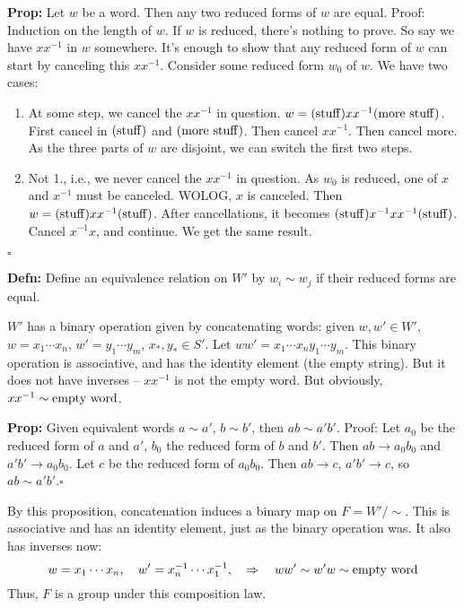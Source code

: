 \documentclass[10pt,letterpaper]{article}
\newcommand{\n}{\hfill\break}
\newcommand{\up}{\vspace{-\baselineskip}}
\newcommand{\hangblock}[2]{\par\noindent\settowidth{\hangindent}{\textbf{#1: }}\textbf{#1: }\!\!\!#2}
\newcommand{\defn}[1]{\hangblock{Defn}{#1}}
\newcommand{\prop}[1]{\hangblock{Prop}{#1}}
\newcommand{\proven}{\;$\square$\n}
\newcommand{\ptxt}[1]{\textrm{\textnormal{#1}}}
\newcommand{\inv}{^{-1}}
\begin{document}
\newpage
\prop{
	Let $w$ be a word. Then any two reduced forms of $w$ are equal.\n
	Proof: Induction on the length of $w$. If $w$ is reduced, there's nothing to prove. So say we have $xx\inv$ in $w$ somewhere. It's enough to show that any reduced form of $w$ can start by canceling this $xx\inv$.\n
	Consider some reduced form $w_{0}$ of $w$. We have two cases:
	\begin{enumerate}[leftmargin=4\parindent]
		\item At some step, we cancel the $xx\inv$ in question. $w=(\ptxt{stuff})xx\inv(\ptxt{more stuff})$. First cancel in $(\ptxt{stuff})$ and $(\ptxt{more stuff})$. Then cancel $xx\inv$. Then cancel more. As the three parts of $w$ are disjoint, we can switch the first two steps.
		\item Not 1., i.e., we never cancel the $xx\inv$ in question. As $w_{0}$ is reduced, one of $x$ and $x\inv$ must be canceled. WOLOG, $x$ is canceled. Then $w=(\ptxt{stuff})xx\inv(\ptxt{stuff})$. After cancellations, it becomes $(\ptxt{stuff})x\inv{}xx\inv(\ptxt{stuff})$. Cancel $x\inv{}x$, and continue. We get the same result.
	\end{enumerate}\up\n
	\proven
}

\defn{
	Define an equivalence relation on $W'$ by $w_{i}\sim{}w_{j}$ if their reduced forms are equal.\n
}

\par\noindent
$W'$ has a binary operation given by concatenating words: given $w,w'\in{}W'$, $w=x_{1}\cdots{}x_{n}$, $w'=y_{1}\cdots{}y_{m}$, $x_{*},y_{*}\in{}S'$. Let $ww'=x_{1}\cdots{}x_{n}y_{1}\cdots{}y_{m}$. This binary operation is associative, and has the identity element (the empty string). But it does not have inverses -- $xx\inv$ is not the empty word. But obviously, $xx\inv\sim\ptxt{empty word}$.\n

\prop{
	Given equivalent words $a\sim{}a'$, $b\sim{}b'$, then $ab\sim{}a'b'$.\n
	Proof: Let $a_{0}$ be the reduced form of $a$ and $a'$, $b_{0}$ the reduced form of $b$ and $b'$. Then $ab\to{}a_{0}b_{0}$ and $a'b'\to{}a_{0}b_{0}$. Let $c$ be the reduced form of $a_{0}b_{0}$. Then $ab\to{}c$, $a'b'\to{}c$, so $ab\sim{}a'b'$.\proven
}

\par\noindent
By this proposition, concatenation induces a binary map on $F=W'/\sim$. This is associative and has an identity element, just as the binary operation was. It also has inverses now:
\[
	w=x_{1}\cdots{}x_{n},\quad{}w'=x_{n}\inv\cdots{}x_{1}\inv,\quad\Rightarrow\quad{}ww'\sim{}w'w\sim\ptxt{empty word}
\]
Thus, $F$ is a group under this composition law.\n
\end{document}
